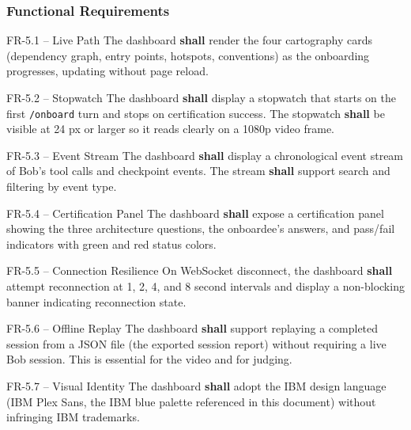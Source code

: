 \documentclass[11pt,letterpaper]{article}
\newcommand{\shall}{\textbf{shall}}
\begin{document}
\subsubsection{Functional Requirements}

\begin{reqbox}{FR-5.1 -- Live Path}
The dashboard \shall{} render the four cartography cards (dependency graph, entry points, hotspots, conventions) as the onboarding progresses, updating without page reload.
\end{reqbox}

\begin{reqbox}{FR-5.2 -- Stopwatch}
The dashboard \shall{} display a stopwatch that starts on the first \texttt{/onboard} turn and stops on certification success. The stopwatch \shall{} be visible at 24 px or larger so it reads clearly on a 1080p video frame.
\end{reqbox}

\begin{reqbox}{FR-5.3 -- Event Stream}
The dashboard \shall{} display a chronological event stream of Bob's tool calls and checkpoint events. The stream \shall{} support search and filtering by event type.
\end{reqbox}

\begin{reqbox}{FR-5.4 -- Certification Panel}
The dashboard \shall{} expose a certification panel showing the three architecture questions, the onboardee's answers, and pass/fail indicators with green and red status colors.
\end{reqbox}

\begin{reqbox}{FR-5.5 -- Connection Resilience}
On WebSocket disconnect, the dashboard \shall{} attempt reconnection at 1, 2, 4, and 8 second intervals and display a non-blocking banner indicating reconnection state.
\end{reqbox}

\begin{reqbox}{FR-5.6 -- Offline Replay}
The dashboard \shall{} support replaying a completed session from a JSON file (the exported session report) without requiring a live Bob session. This is essential for the video and for judging.
\end{reqbox}

\begin{reqbox}{FR-5.7 -- Visual Identity}
The dashboard \shall{} adopt the IBM design language (IBM Plex Sans, the IBM blue palette referenced in this document) without infringing IBM trademarks.
\end{reqbox}
\end{document}
